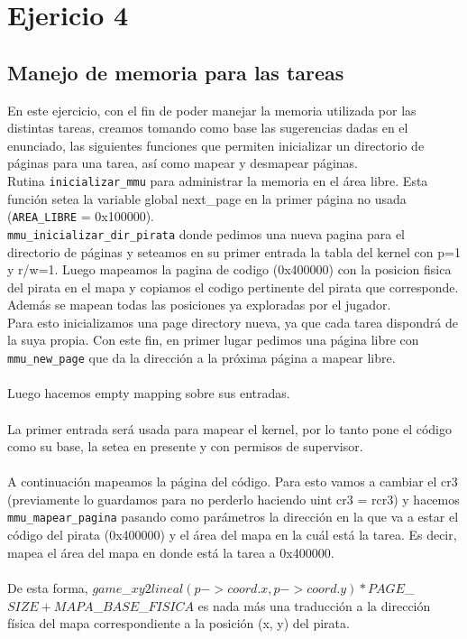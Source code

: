 \section{Ejericio 4}

\subsection{Manejo de memoria para las tareas}

En este ejercicio, con el fin de poder manejar la memoria utilizada por las distintas tareas, creamos tomando como base las sugerencias dadas en el enunciado, las siguientes funciones que permiten inicializar un directorio de páginas para una tarea, así como mapear y desmapear páginas.\\

Rutina \texttt{inicializar\_mmu} para administrar la memoria en el área libre. Esta función setea la variable global next\_page en la primer página no usada (\texttt{AREA\_LIBRE} = 0x100000). \\

\texttt{mmu\_inicializar\_dir\_pirata}  donde pedimos una nueva pagina para el directorio de páginas y seteamos en su primer entrada la tabla del kernel con p=1 y r/w=1. Luego mapeamos la pagina de codigo (0x400000) con la posicion fisica del pirata en el mapa y copiamos el codigo pertinente del pirata que corresponde. Además se mapean todas las posiciones ya exploradas por el jugador.\\

Para esto inicializamos una page directory nueva, ya que cada tarea dispondrá de la suya propia. Con este fin, en primer lugar pedimos una página libre con \texttt{mmu\_new\_page} que da la dirección a la próxima página a mapear libre.\\\\ Luego hacemos empty mapping sobre sus entradas.\\\\
La primer entrada será usada para mapear el kernel, por lo tanto pone el código como su base, la setea en presente y con permisos de supervisor.\\\\
A continuación mapeamos la página del código. Para esto vamos a cambiar el cr3 (previamente lo guardamos para no perderlo haciendo uint cr3 = rcr3) y hacemos \texttt{mmu\_mapear\_pagina} pasando como parámetros la dirección en la que va a estar el código del pirata (0x400000) y el área del mapa en la cuál está la tarea. Es decir, mapea el área del mapa en donde está la tarea a 0x400000.\\\\
De esta forma, $game$\_$xy2lineal(p->coord.x, p->coord.y) * PAGE$\_$SIZE + MAPA$\_$BASE$\_$FISICA$ es nada más una traducción a la dirección física del mapa correspondiente a la posición (x, y) del pirata.\\

